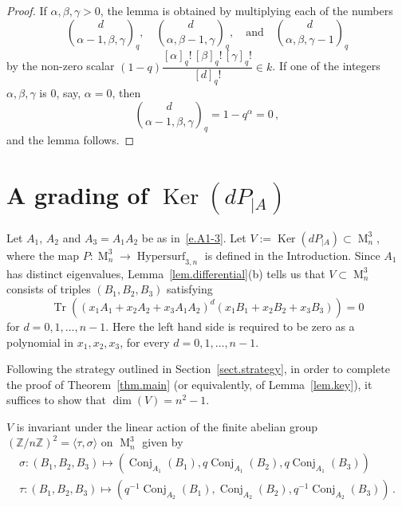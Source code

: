 \documentclass[12pt]{amsart}
\numberwithin{equation}{section}
\numberwithin{subsection}{section}
\theoremstyle{definition} \newtheorem{definition}[theorem]{Definition}
\newcommand\Conj{\operatorname{Conj}}
\newcommand\Hypersurf{\operatorname{Hypersurf}}
\newcommand\bbZ{\mathbb{Z}}
\newcommand\Ker{\operatorname{Ker}}
\newcommand{\tr}{\operatorname{Tr}}
\newcommand{\Mat}{\operatorname{M}}
\begin{document}
\begin{proof} If $\alpha, \beta, \gamma > 0$, the lemma is obtained 
by multiplying each of the numbers
\[ \binom{d}{\alpha-1, \beta, \gamma}_q, \quad   
\binom{d}{\alpha, \beta -1, \gamma}_q , \quad \text{and} \quad 
 \binom{d}{\alpha, \beta, \gamma-1}_q 
\]
by the non-zero scalar
$(1- q) \dfrac{[\alpha]_q ! \, [\beta]_q! \, [\gamma]_q!}{[d]_q !} \in k$.
If one of the integers $\alpha, \beta, \gamma$ is $0$, say, $\alpha = 0$,
then 
\[ \binom{d}{\alpha-1, \beta, \gamma}_q = 1 - q^{\alpha} = 0 \, , \]
and the lemma follows.   
\end{proof}

\section{A grading of $\Ker(dP_{|A})$}
\label{sect.grading}

Let $A_1$, $A_2$ and $A_3 = A_1 A_2$ be as in~\eqref{e.A1-3}.
Let $V := \Ker(dP_{|A}) \subset \Mat_{n}^3$, where the map 
$P \colon \Mat_n^3 \to \Hypersurf_{3, n}$ is defined in
the Introduction.  Since $A_1$ has distinct eigenvalues, 
Lemma~\ref{lem.differential}(b) tells us that $V \subset \Mat_n^3$ 
consists of triples $(B_1, B_2, B_3)$ satisfying
\[ \tr((x_1 A_1 + x_2 A_2 + x_3 A_1 A_2)^d (x_1 B_1 + x_2 B_2 + x_3 B_3)) = 0 \]
for $d = 0, 1, \dots, n-1$. Here the left hand side is required to be 
zero as a polynomial in $x_1, x_2, x_3$, for every  
$d = 0, 1, \dots, n-1$. 

Following the strategy outlined in Section~\ref{sect.strategy},
in order to complete the proof of Theorem~\ref{thm.main} 
(or equivalently, of Lemma~\ref{lem.key}), it suffices 
to show that $\dim(V) = n^2 - 1$.

\begin{lemma} \label{lem.invariance} 
$V$ is invariant under the linear action of the finite 
abelian group
$(\bbZ/n \bbZ)^2 = \langle \tau, \sigma \rangle $ on $\Mat_n^3$ given 
by 
\begin{gather} \label{e.grading}
\sigma \colon (B_1, B_2, B_3) \mapsto (\Conj_{A_1}(B_1), 
q \Conj_{A_1}(B_2), q \Conj_{A_1}(B_3)) \\
\tau \colon (B_1, B_2, B_3) \mapsto (q^{-1} \Conj_{A_2}(B_1), 
 \Conj_{A_2}(B_2), q^{-1} \Conj_{A_2} (B_3) )  \, .
\end{gather}
\end{lemma}
\end{document}
